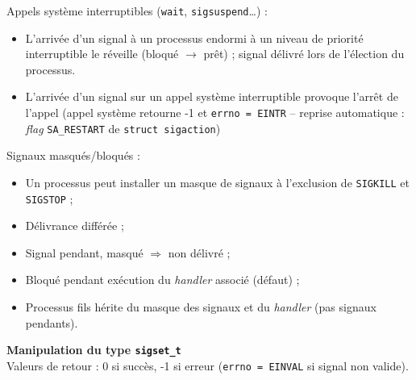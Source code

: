 \documentclass[french]{scrartcl}
\begin{document}
\begin{multicols}{3}
Appels système interruptibles (\lstinline!wait!, \lstinline!sigsuspend!\dots) : \begin{itemize}
	\item L’arrivée d’un signal à un processus endormi à un niveau de priorité interruptible le réveille (bloqué $\rightarrow$ prêt) ; signal délivré lors de l'élection du processus.                                                                                   
	\item L'arrivée d'un signal sur un appel système interruptible provoque l'arrêt de l'appel (appel système retourne -1 et \lstinline!errno = EINTR! -- reprise automatique : \emph{flag} \lstinline!SA_RESTART! de \lstinline!struct sigaction!)
\end{itemize}


Signaux masqués/bloqués :\begin{itemize} 
	\item Un processus peut installer un masque de signaux à l'exclusion de \lstinline!SIGKILL! et \lstinline!SIGSTOP! ;
	\item Délivrance différée ;
	\item Signal pendant, masqué $\Rightarrow$ non délivré ;
	\item Bloqué pendant exécution du \emph{handler} associé (défaut) ;
	\item Processus fils hérite du masque des signaux et du \emph{handler} (pas signaux pendants).
\end{itemize}

\vskip 5pt
\textbf{Manipulation du type \lstinline!sigset_t!}\\
Valeurs de retour : 0 si succès, -1 si erreur (\lstinline!errno = EINVAL! si signal non valide).


\end{multicols}
\end{document}
